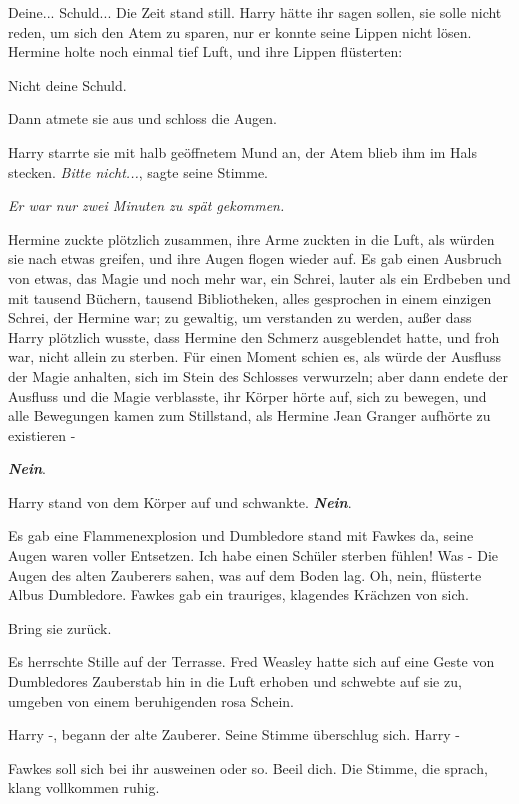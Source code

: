 \glqq Deine... Schuld...\grqq{} Die Zeit stand still. Harry hätte ihr sagen
sollen, sie solle nicht reden, um sich den Atem zu sparen, nur er konnte seine
Lippen nicht lösen. Hermine holte noch einmal tief Luft, und ihre Lippen
flüsterten:

\glqq Nicht deine Schuld.\grqq{}

Dann atmete sie aus und schloss die Augen.

Harry starrte sie mit halb geöffnetem Mund an, der Atem blieb ihm im Hals
stecken. \glqq \emph{Bitte nicht...}\grqq{}, sagte seine Stimme.

\emph{Er war nur zwei Minuten zu spät gekommen.}

Hermine zuckte plötzlich zusammen, ihre Arme zuckten in die Luft, als würden sie
nach etwas greifen, und ihre Augen flogen wieder auf. Es gab einen Ausbruch von
etwas, das Magie und noch mehr war, ein Schrei, lauter als ein Erdbeben und mit
tausend Büchern, tausend Bibliotheken, alles gesprochen in einem einzigen
Schrei, der Hermine war; zu gewaltig, um verstanden zu werden, außer dass Harry
plötzlich wusste, dass Hermine den Schmerz ausgeblendet hatte, und froh war,
nicht allein zu sterben. Für einen Moment schien es, als würde der Ausfluss der
Magie anhalten, sich im Stein des Schlosses verwurzeln; aber dann endete der
Ausfluss und die Magie verblasste, ihr Körper hörte auf, sich zu bewegen, und
alle Bewegungen kamen zum Stillstand, als Hermine Jean Granger aufhörte zu
existieren -

\textbf{\emph{Nein}}.

Harry stand von dem Körper auf und schwankte.
\textbf{}
\textbf{\emph{Nein}}.

Es gab eine Flammenexplosion und Dumbledore stand mit Fawkes da, seine Augen
waren voller Entsetzen. \glqq Ich habe einen Schüler sterben fühlen! Was
-\grqq{} Die Augen des alten Zauberers sahen, was auf dem Boden lag. \glqq Oh,
nein\grqq{}, flüsterte Albus Dumbledore. Fawkes gab ein trauriges, klagendes
Krächzen von sich.

\glqq Bring sie zurück.\grqq{}

Es herrschte Stille auf der Terrasse. Fred Weasley hatte sich auf eine Geste von
Dumbledores Zauberstab hin in die Luft erhoben und schwebte auf sie zu, umgeben
von einem beruhigenden rosa Schein.

\glqq Harry -\grqq{}, begann der alte Zauberer. Seine Stimme überschlug sich.
\glqq Harry -\grqq{}

\glqq Fawkes soll sich bei ihr ausweinen oder so. Beeil dich.\grqq{} Die Stimme,
die sprach, klang vollkommen ruhig.

